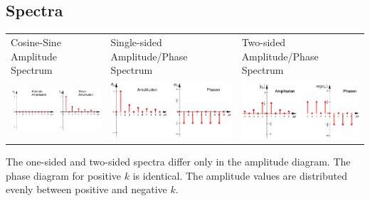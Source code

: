    \subsection{Spectra}
   	\begin{tabular}{p{6cm} p{6cm} p{6cm}}
		Cosine-Sine Amplitude Spectrum &
		Single-sided Amplitude/Phase Spectrum &
		Two-sided Amplitude/Phase Spectrum \\
   		\includegraphics[width=5cm]{Content/03_transforms/cosSinSpectr.png} &
   		\includegraphics[width=5cm]{Content/03_transforms/EinseitigSpectr.png} &
   		\includegraphics[width=5cm]{Content/03_transforms/ZweiseitigSpectr.png}
   	\end{tabular}
   	The one-sided and two-sided spectra differ only in the amplitude diagram.
	The phase diagram for positive $k$ is identical.
	The amplitude values are distributed evenly between positive and negative $k$.
